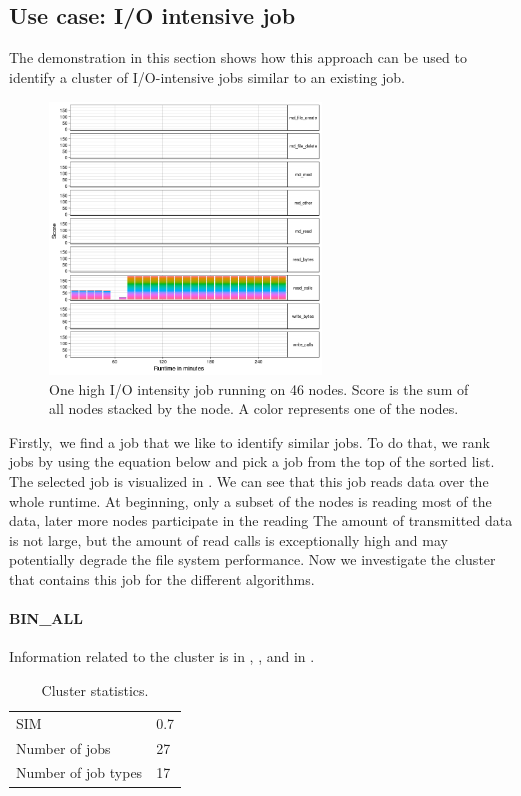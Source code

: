 \documentclass[]{llncs}
\begin{document}
\subsection{Use case: I/O intensive job}
The demonstration in this section shows how this approach can be used to identify a cluster of I/O-intensive jobs similar to an existing job.

\begin{figure}
  \centering
  \includegraphics[width=2.84in,height=2.85in]{./media/image1.png}
  \caption{One high I/O intensity job running on 46 nodes. Score is the sum of all nodes stacked by the node. A color represents one of the nodes.}
  \label{fig:use_case}
\end{figure}

Firstly,\ we find a job that we like to identify similar jobs.
To do that, we rank jobs by using the equation below and pick a job from the top of the sorted list.
The selected job is visualized in .
We can see that this job reads data over the whole runtime.
At beginning, only a subset of the nodes is reading most of the data, later more nodes participate in the reading The amount of transmitted data is not large, but the amount of read calls is exceptionally high and may potentially degrade the file system performance.
Now we investigate the cluster that contains this job for the different algorithms.

\paragraph{BIN\_ALL}
Information related to the cluster is in , , and in .

\begin{table}
  \centering
  \begin{tabular}{ll}
    SIM & 0.7 \\
    Number of jobs & 27 \\
    Number of job types & 17 \\
  \end{tabular}
  \caption{Cluster statistics.}
  \label{tab:use_case:bin_all:stats}
\end{table}
\end{document}
